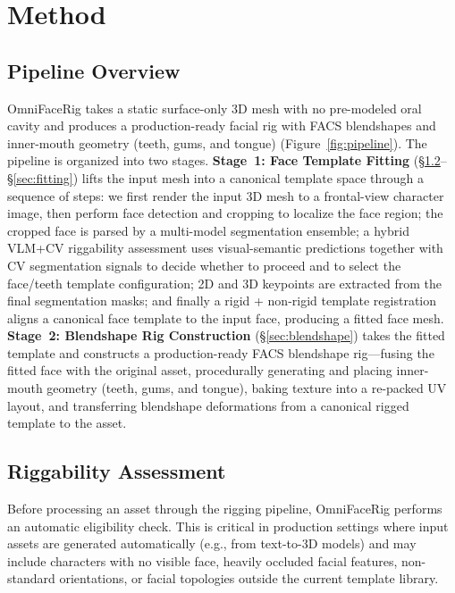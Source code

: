 \documentclass[acmtog,anonymous,review]{acmart}
\begin{document}
\section{Method}
\label{sec:method}

\subsection{Pipeline Overview}
\label{sec:overview}

OmniFaceRig takes a static surface-only 3D mesh with no pre-modeled oral cavity and produces a production-ready facial rig with FACS blendshapes and inner-mouth geometry (teeth, gums, and tongue) (Figure~\ref{fig:pipeline}). The pipeline is organized into two stages. \textbf{Stage~1: Face Template Fitting} (\S\ref{sec:riggability}--\S\ref{sec:fitting}) lifts the input mesh into a canonical template space through a sequence of steps: we first render the input 3D mesh to a frontal-view character image, then perform face detection and cropping to localize the face region; the cropped face is parsed by a multi-model segmentation ensemble; a hybrid VLM+CV riggability assessment uses visual-semantic predictions together with CV segmentation signals to decide whether to proceed and to select the face/teeth template configuration; 2D and 3D keypoints are extracted from the final segmentation masks; and finally a rigid + non-rigid template registration aligns a canonical face template to the input face, producing a fitted face mesh. \textbf{Stage~2: Blendshape Rig Construction} (\S\ref{sec:blendshape}) takes the fitted template and constructs a production-ready FACS blendshape rig---fusing the fitted face with the original asset, procedurally generating and placing inner-mouth geometry (teeth, gums, and tongue), baking texture into a re-packed UV layout, and transferring blendshape deformations from a canonical rigged template to the asset.


\subsection{Riggability Assessment}
\label{sec:riggability}

Before processing an asset through the rigging pipeline, OmniFaceRig performs an automatic eligibility check. This is critical in production settings where input assets are generated automatically (e.g., from text-to-3D models) and may include characters with no visible face, heavily occluded facial features, non-standard orientations, or facial topologies outside the current template library.
\end{document}
